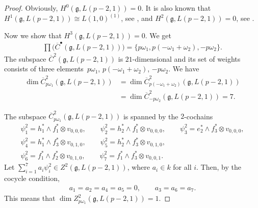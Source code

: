 \documentclass[10pt,a4paper]{amsart}
\numberwithin{equation}{section}
\begin{document}
\begin{proof}
Obviously, $H^0(\mathfrak{g},L(p-2,1))=0$. It is also known that $H^1(\mathfrak{g},L(p-2,1))\cong L(1,0)^{(1)}$, see \cite[p.~301]{Jan91}, and $H^2(\mathfrak{g},L(p-2,1))=0$, see \cite[Theorem~1.1]{DI02}.

Now we show that $H^3(\mathfrak{g},L(p-2,1))=0$. We get
\begin{gather*}
\prod\big(\overline{C}^{\bullet}(\mathfrak{g},L(p-2,1))\big)=\{p\omega_1, p(-\omega_1+\omega_2), -p\omega_2\}.
\end{gather*}
The subspace $\overline{C}^2(\mathfrak{g},L(p-2,1))$ is $21$-dimensional and its set of weights consists of three ele\-ments~$p\omega_1$, $p(-\omega_1+\omega_2)$, $-p\omega_2$. We have
\begin{align*}
\dim \overline{C}^2_{p\omega_1}(\mathfrak{g},L(p-2,1))
&=\dim \overline{C}^2_{p(-\omega_1+\omega_2)}(\mathfrak{g},L(p-2,1))
\\
&=\dim \overline{C}^2_{-p\omega_2}(\mathfrak{g},L(p-2,1))=7.
\end{align*}

The subspace $\overline{C}^2_{p\omega_1}(\mathfrak{g},L(p-2,1))$ is spanned by the $2$-cochains
\begin{gather*}
\psi_1^2=h_1^*\wedge f_1^*\otimes v_{0,0,0},\qquad
\psi_2^2=h_2^*\wedge f_1^*\otimes v_{0,0,0},\qquad
\psi_3^2=e_2^*\wedge f_3^*\otimes v_{0,0,0},
\\
\psi_4^2=h_1^*\wedge f_3^*\otimes v_{0,1,0},\qquad
\psi_5^2=h_2^*\wedge f_3^*\otimes v_{0,1,0},
\\
\psi_6^2=f_1^*\wedge f_2^*\otimes v_{0,1,0},\qquad
\psi_7^2=f_1^*\wedge f_3^*\otimes v_{0,0,1}.
\end{gather*}
Let $\sum_{i=1}^7a_i\psi_i^2\in Z^2(\mathfrak{g},L(p-2,1))$, where $a_i\in k$ for all $i$. Then, by the cocycle condition,
\begin{gather*}
a_1=a_2=a_4=a_5=0,\qquad
a_3=a_6=a_7.
\end{gather*}
This means that $\dim Z^2_{p\omega_1}(\mathfrak{g},L(p-2,1))=1$.


\end{proof}
\end{document}
